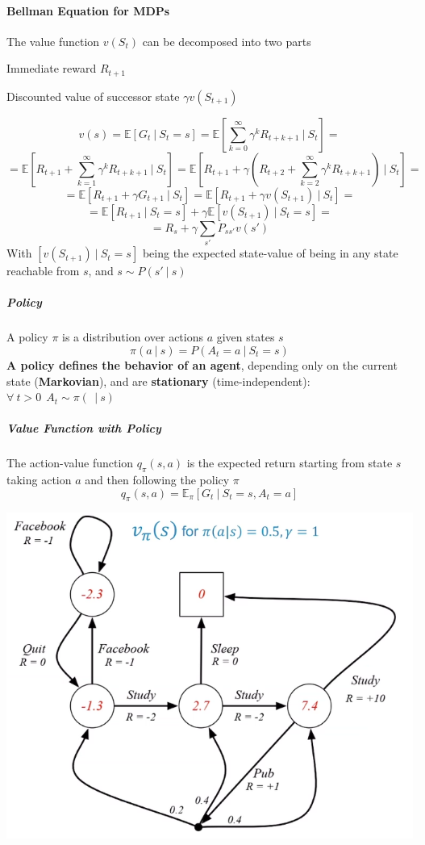 \documentclass[10pt]{report}
\begin{document}
\paragraph{Bellman Equation for MDPs} The value function $v(S_t)$ can be decomposed into two parts
\begin{list}{}{}
	\item Immediate reward $R_{t+1}$
	\item Discounted value of successor state $\gamma v(S_{t+1})$
\end{list}
$$v(s)=\mathbb{E}[G_t\:|\:S_t=s] = \mathbb{E}\left[\sum_{k=0}^\infty\gamma^kR_{t+k+1}\:|\:S_t\right]=$$
$$= \mathbb{E}\left[R_{t+1}+\sum_{k=1}^\infty\gamma^k R_{t+k+1}\:|\:S_t\right]= \mathbb{E}\left[R_{t+1}+\gamma\left(R_{t+2}+\sum_{k=2}^\infty\gamma^k R_{t+k+1}\right)\:|\:S_t\right]=$$
$$= \mathbb{E}[R_{t+1}+\gamma G_{t+1}\:|\:S_t] = \mathbb{E}[R_{t+1}+\gamma v(S_{t+1})\:|\:S_t] =$$
$$= \mathbb{E}[R_{t+1}\:|\:S_t=s] + \gamma \mathbb{E}[v(S_{t+1})\:|\:S_t=s]=$$
$$=R_s+\gamma\sum_{s'}P_{ss'}v(s')$$
With $[v(S_{t+1})\:|\:S_t=s]$ being the expected state-value of being in any state reachable from $s$, and $s\sim P(s'\:|\:s)$
\subparagraph{Policy} A policy $\pi$ is a distribution over actions $a$ given states $s$ $$\pi(a\:|\:s) = P(A_t=a\:|\: S_t=s)$$
\textbf{A policy defines the behavior of an agent}, depending only on the current state (\textbf{Markovian}), and are \textbf{stationary} (time-independent): $\forall\:t>0\:\:A_t\sim \pi(\:\:|\:s)$
\subparagraph{Value Function with Policy} The action-value function $q_\pi(s,a)$ is the expected return starting from state $s$ taking action $a$ and then following the policy $\pi$
$$q_\pi(s,a) = \mathbb{E}_\pi[G_t\:|\:S_t=s, A_t=a]$$
\begin{center}
	\includegraphics[scale=0.5]{161.png}
\end{center}
\end{document}
